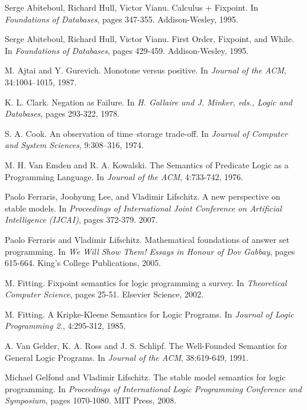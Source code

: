 \documentclass[11pt]{article}
\begin{document}
\begin{thebibliography}{16}
  Serge Abiteboul, Richard Hull, Victor Vianu.
  Calculus + Fixpoint.
  In \textit{Foundations of Databases}, pages 347-355.
  Addison-Wesley, 1995.

  Serge Abiteboul, Richard Hull, Victor Vianu.
  First Order, Fixpoint, and While.
  In \textit{Foundations of Databases}, pages 429-459.
  Addison-Wesley, 1995.

  M. Ajtai and Y. Gurevich. 
  Monotone versus positive. 
  In \textit{Journal of the ACM}, 34:1004–1015, 1987.

  K. L. Clark.
  Negation as Failure.
  In \textit{H. Gallaire and J. Minker, eds., Logic and Databases}, pages 293-322, 1978.

  S. A. Cook. 
  An observation of time–storage trade-off. 
  In \textit{Journal of Computer and System Sciences}, 9:308–316, 1974.

  M. H. Van Emden and R. A. Kowalski.
  The Semantics of Predicate Logic as a Programming Language.
  In \textit{Journal of the ACM}, 4:733-742, 1976.

  Paolo Ferraris, Joohyung Lee, and Vladimir Lifschitz. 
  A new perspective on stable models.  
  In \textit{Proceedings of International Joint Conference on Artificial Intelligence (IJCAI)}, pages 372-379. 
  2007.

  Paolo Ferraris and Vladimir Lifschitz. 
  Mathematical foundations of answer set programming.  
  In \textit{We Will Show Them! Essays in Honour of Dov Gabbay}, pages 615-664. 
  King's College Publications, 2005.

  M. Fitting. 
  Fixpoint semantics for logic programming a survey. 
  In \textit{Theoretical Computer Science}, pages 25-51. Elsevier Science, 2002.

  M. Fitting.
  A Kripke-Kleene Semantics for Logic Programs.
  In \textit{Journal of Logic Programming 2.}, 4:295-312, 1985.

  A. Van Gelder, K. A. Ross and J. S. Schlipf.
  The Well-Founded Semantics for General Logic Programs.
  In \textit{Journal of the ACM}, 38:619-649, 1991.

  Michael Gelfond and Vladimir Lifschitz. 
  The stable model semantics for logic programming.  
  In \textit{Proceedings of International Logic Programming Conference and Symposium}, pages 1070-1080. 
  MIT Press, 2008.


\end{thebibliography}
\end{document}
